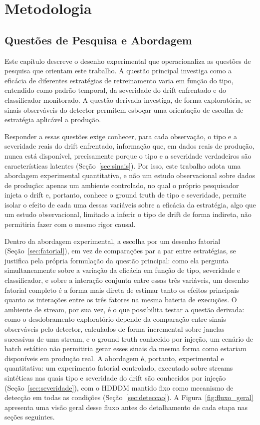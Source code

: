 \chapter{Metodologia}

\section{Questões de Pesquisa e Abordagem}
\label{sec:questoes}
Este capítulo descreve o desenho experimental que operacionaliza as questões
de pesquisa que orientam este trabalho. A questão
principal investiga como a eficácia de diferentes estratégias de
retreinamento varia em função do tipo, entendido como padrão temporal, da
severidade do drift enfrentado e do classificador monitorado. A questão
derivada investiga, de forma exploratória, se sinais observáveis do detector
permitem esboçar uma orientação de escolha de estratégia aplicável a
produção.

Responder a essas questões exige conhecer, para cada observação, o tipo e a
severidade reais do drift enfrentado, informação que, em dados reais de
produção, nunca está disponível, precisamente porque o tipo e a severidade
verdadeiros são características latentes (Seção~\ref{sec:sinais}). Por isso,
este trabalho adota uma abordagem experimental quantitativa, e não um estudo
observacional sobre dados de produção: apenas um ambiente controlado, no
qual o próprio pesquisador injeta o drift e, portanto, conhece o ground
truth de tipo e severidade, permite isolar o efeito de cada uma dessas
variáveis sobre a eficácia da estratégia, algo que um estudo observacional,
limitado a inferir o tipo de drift de forma indireta, não permitiria fazer
com o mesmo rigor causal.

Dentro da abordagem experimental, a escolha por um desenho fatorial
(Seção~\ref{sec:fatorial}), em vez de comparações par a par entre
estratégias, se justifica pela própria formulação da questão principal: como
ela pergunta simultaneamente sobre a variação da eficácia em função de tipo,
severidade e classificador, e sobre a interação conjunta entre essas três
variáveis, um desenho fatorial completo é a forma mais direta de estimar tanto os
efeitos principais quanto as interações entre os três fatores na mesma
bateria de execuções. O ambiente de stream, por sua vez, é o que possibilita
testar a questão derivada: como
o desdobramento exploratório depende da comparação entre sinais observáveis
pelo detector, calculados de forma incremental sobre janelas sucessivas de
uma stream, e o ground truth conhecido por injeção, um cenário de batch
estático não permitiria gerar esses sinais da mesma forma como estariam
disponíveis em produção real. A abordagem é, portanto, experimental e
quantitativa: um experimento fatorial controlado, executado sobre streams
sintéticas nas quais tipo e severidade do drift são conhecidos por injeção
(Seção~\ref{sec:severidade}), com o HDDDM mantido fixo como mecanismo de
detecção em todas as condições (Seção~\ref{sec:deteccao}). A
Figura~\ref{fig:fluxo_geral} apresenta uma visão geral desse fluxo antes do
detalhamento de cada etapa nas seções seguintes.


